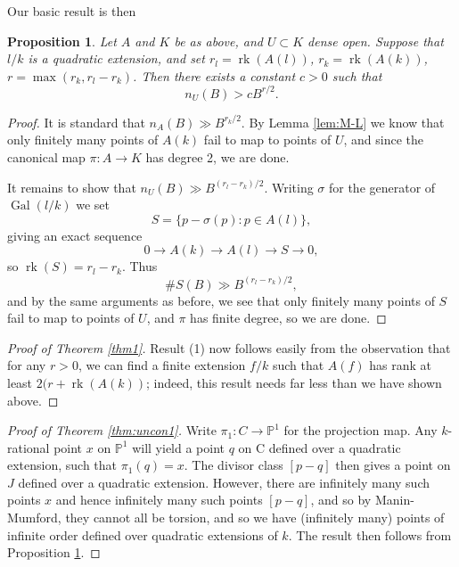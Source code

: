 \documentclass[a4paper,12pt]{amsart}
\newtheorem{proposition}[definition]{Proposition}
\begin{document}
Our basic result is then
\begin{proposition}\label{prop:basic}
Let $A$ and $K$ be as above, and $U \subset K$ dense open. Suppose that $l/k$ is a quadratic extension, and set $r_{l} = {\operatorname{rk}}(A(l))$, $r_{k}  = {\operatorname{rk}}(A(k))$, $r = \max(r_{k}, r_{l}-r_{k})$. Then there exists a constant $c>0$ such that 
\begin{equation}
n_U(B) > c B^{r/2}. 
\end{equation}
\end{proposition}
\begin{proof}
It is standard that $n_A(B) \gg B^{r_{k}/2}$. By Lemma  \ref{lem:M-L} we know that only finitely many points of $A(k)$ fail to map to points of $U$, and since the canonical map $\pi: A \rightarrow K$ has degree 2, we are done. 

It remains to show that $n_U(B) \gg B^{(r_{l}-r_{k})/2}$. Writing $\sigma$ for the generator of $\operatorname{Gal}(l/k)$ we set 
\begin{equation}
S = \{p - \sigma(p) : p \in A(l) \}, 
\end{equation}
giving an exact sequence
\begin{equation}
0 \rightarrow A(k) \rightarrow A(l) \rightarrow S \rightarrow 0, 
\end{equation}
so ${\operatorname{rk}}(S) = r_{l}-r_{k}$. Thus 
\begin{equation}
\#S(B) \gg B^{(r_{l}-r_{k})/2}, 
\end{equation}
and by the same arguments as before, we see that only finitely many points of $S$ fail to map to points of $U$, and $\pi$ has finite degree, so we are done. 
\end{proof}

\begin{proof}[Proof of Theorem \ref{thm1}]
Result (1) now follows easily from the observation that for any $r>0$, we can find a finite extension $f/k$ such that $A(f)$ has rank at least $2(r+{\operatorname{rk}}(A(k))$; indeed, this result needs far less than we have shown above. 
\end{proof}

\begin{proof}[Proof of Theorem \ref{thm:uncon1}]
Write $\pi_1:C \rightarrow {{\mathbb P}}^1$ for the projection map. Any $k$-rational point $x$ on ${{\mathbb P}}^{1}$ will yield a point $q$ on C defined over a quadratic extension, such that $\pi_{1}(q) = x$. The divisor class $[p-q]$ then gives a point on $J$ defined over a quadratic extension. 
However, there are infinitely many such points $x$ and hence infinitely many such points $[p-q]$, and so by Manin-Mumford, they cannot all be torsion, and so we have (infinitely many) points of infinite order defined over quadratic extensions of $k$. The result then follows from Proposition \ref{prop:basic}. 
\end{proof}
\end{document}
